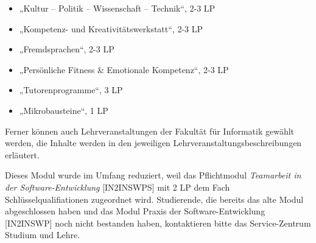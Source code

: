 \begin{module}
\begin{content}
 \begin{itemize}\item „Kultur – Politik – Wissenschaft – Technik“, 2-3 LP  \item „Kompetenz- und Kreativitätswerkstatt“, 2-3 LP  \item „Fremdsprachen“, 2-3 LP  \item „Persönliche Fitness \& Emotionale Kompetenz“, 2-3 LP  \item „Tutorenprogramme“, 3 LP  \item „Mikrobausteine“, 1 LP  \end{itemize}

Ferner können auch Lehrveranstaltungen der Fakultät für Informatik gewählt werden, die Inhalte werden in den jeweiligen Lehrveranstaltungsbeschreibungen erläutert.


\end{content}

\begin{remarks}Dieses Modul wurde im Umfang reduziert, weil das Pflichtmodul \emph{Teamarbeit in der Software-Entwicklung} [IN2INSWPS] mit 2 LP dem Fach Schlüsselqualifiationen zugeordnet wird. Studierende, die bereits das alte Modul abgeschlossen haben und das Modul Praxis der Software-Entwicklung [IN2INSWP] noch nicht bestanden haben, kontaktieren bitte das Service-Zentrum Studium und Lehre.

\end{remarks}

\end{module}

